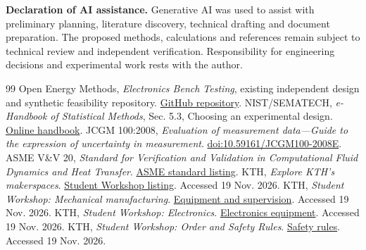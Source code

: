\documentclass[11pt,a4paper]{article}
\begin{document}
\smallskip
\textbf{Declaration of AI assistance.} Generative AI was used to assist with preliminary planning, literature discovery, technical drafting and document preparation. The proposed methods, calculations and references remain subject to technical review and independent verification. Responsibility for engineering decisions and experimental work rests with the author.

\begingroup\small\setlength{\parskip}{1pt}
\begin{thebibliography}{99}\setlength{\itemsep}{2pt}\setlength{\parsep}{0pt}
 Open Energy Methods, \emph{Electronics Bench Testing}, existing independent design and synthetic feasibility repository. \href{https://github.com/Open-Energy-Methods/electronics-bench-testing}{GitHub repository}.
 NIST/SEMATECH, \emph{e-Handbook of Statistical Methods}, Sec. 5.3, Choosing an experimental design. \href{https://www.itl.nist.gov/div898/handbook/pri/section3/pri3.htm}{Online handbook}.
 JCGM 100:2008, \emph{Evaluation of measurement data---Guide to the expression of uncertainty in measurement}. \href{https://doi.org/10.59161/JCGM100-2008E}{doi:10.59161/JCGM100-2008E}.
 ASME V\&V 20, \emph{Standard for Verification and Validation in Computational Fluid Dynamics and Heat Transfer}. \href{https://www.asme.org/codes-standards/find-codes-standards/standard-for-verification-and-validation-in-computational-fluid-dynamics-and-heat-transfer}{ASME standard listing}.
 KTH, \emph{Explore KTH's makerspaces}. \href{https://www.kth.se/en/student/kontakt/campus/makerspaces/explore/explore-1.1455863}{Student Workshop listing}. Accessed 19 Nov. 2026.
 KTH, \emph{Student Workshop: Mechanical manufacturing}. \href{https://www.kth.se/emp/student-workshop/verkstan/mekanik-1.686913}{Equipment and supervision}. Accessed 19 Nov. 2026.
 KTH, \emph{Student Workshop: Electronics}. \href{https://www.kth.se/emp/student-workshop/verkstan/elektronik-1.686912}{Electronics equipment}. Accessed 19 Nov. 2026.
 KTH, \emph{Student Workshop: Order and Safety Rules}. \href{https://www.kth.se/emp/student-workshop/regler-och-sakerhet}{Safety rules}. Accessed 19 Nov. 2026.
\end{thebibliography}\endgroup
\end{document}
